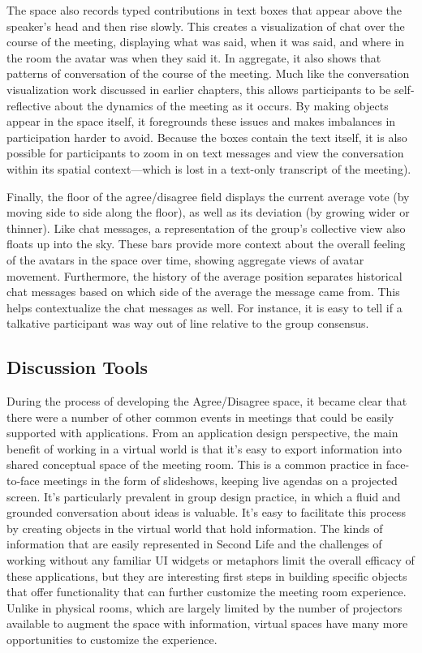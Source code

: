 The space also records typed contributions in text boxes that appear above the speaker's head and then rise slowly. This creates a visualization of chat over the course of the meeting, displaying what was said, when it was said, and where in the room the avatar was when they said it. \citep{DiMicco:2007ie} In aggregate, it also shows that patterns of conversation of the course of the meeting. Much like the conversation visualization work discussed in earlier chapters, this allows participants to be self-reflective about the dynamics of the meeting as it occurs. By making objects appear in the space itself, it foregrounds these issues and makes imbalances in participation harder to avoid. Because the boxes contain the text itself, it is also possible for participants to zoom in on text messages and view the conversation within its spatial context---which is lost in a text-only transcript of the meeting).

Finally, the floor of the agree/disagree field displays the current average vote (by moving side to side along the floor), as well as its deviation (by growing wider or thinner). Like chat messages, a representation of the group's collective view also floats up into the sky. These bars provide more context about the overall feeling of the avatars in the space over time, showing aggregate views of avatar movement. Furthermore, the history of the average position separates historical chat messages based on which side of the average the message came from. This helps contextualize the chat messages as well. For instance, it is easy to tell if a talkative participant was way out of line relative to the group consensus.

\subsection{Discussion Tools}

During the process of developing the Agree/Disagree space, it became clear that there were a number of other common events in meetings that could be easily supported with applications. From an application design perspective, the main benefit of working in a virtual world is that it's easy to export information into shared conceptual space of the meeting room. This is a common practice in face-to-face meetings in the form of slideshows, keeping live agendas on a projected screen. It's particularly prevalent in group design practice, in which a fluid and grounded conversation about ideas is valuable. \citep{Dwyer:2005uj} It's easy to facilitate this process by creating objects in the virtual world that hold information. The kinds of information that are easily represented in Second Life and the challenges of working without any familiar UI widgets or metaphors limit the overall efficacy of these applications, but they are interesting first steps in building specific objects that offer functionality that can further customize the meeting room experience. Unlike in physical rooms, which are largely limited by the number of projectors available to augment the space with information, virtual spaces have many more opportunities to customize the experience.

